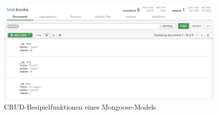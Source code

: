 \begin{figure}[tbt]
\centering
\includegraphics[width=15cm]{images/mongodb_compass.png}
\caption{CRUD-Besipielfunktionen eines Mongoose-Models}
\end{figure}